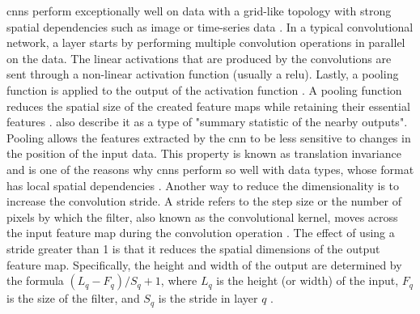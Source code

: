 \glspl{cnn} perform exceptionally well on data with a grid-like topology with strong spatial dependencies such as image or time-series data \cite{aggarwal2018NeuralNetworksDeep, Goodfellow-et-al-2016}.
In a typical convolutional network, a layer starts by performing multiple convolution operations in parallel on the data.
The linear activations that are produced by the convolutions are sent through a non-linear activation function (usually a \gls{relu}).
Lastly, a pooling function is applied to the output of the activation function \cite{aggarwal2018NeuralNetworksDeep}.
A pooling function reduces the spatial size of the created feature maps while retaining their essential features \cite{Goodfellow-et-al-2016, aggarwal2018NeuralNetworksDeep}.
\textcite[p. 335]{Goodfellow-et-al-2016} also describe it as a type of "summary statistic of the nearby outputs".
Pooling allows the features extracted by the \gls{cnn} to be less sensitive to changes in the position of the input data.
This property is known as translation invariance and is one of the reasons why \glspl{cnn} perform so well with data types, whose format has local spatial dependencies \cite{Goodfellow-et-al-2016, aggarwal2018NeuralNetworksDeep}.
Another way to reduce the dimensionality is to increase the convolution stride.
A stride refers to the step size or the number of pixels by which the filter, also known as the convolutional kernel, moves across the input feature map during the convolution operation \cite{aggarwal2018NeuralNetworksDeep}.
The effect of using a stride greater than 1 is that it reduces the spatial dimensions of the output feature map. 
Specifically, the height and width of the output are determined by the formula $(L_q - F_q)/S_q + 1$, where $L_q$ is the height (or width) of the input, $F_q$ is the size of the filter, and $S_q$ is the stride in layer $q$ \cite[p. 324]{aggarwal2018NeuralNetworksDeep}.

